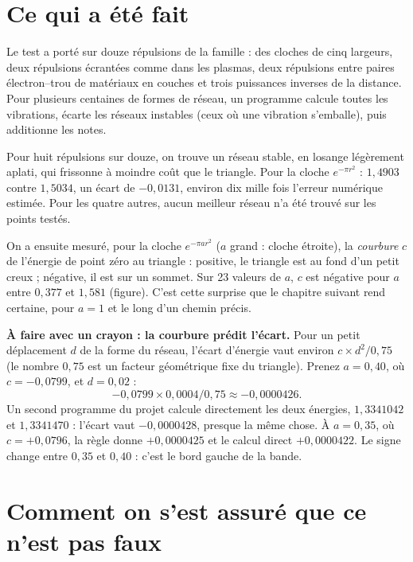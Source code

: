 \section*{Ce qui a été fait}

Le test a porté sur douze répulsions de la famille : des cloches de cinq largeurs, deux
répulsions écrantées comme dans les plasmas, deux répulsions entre paires électron--trou de
matériaux en couches et trois puissances inverses de la distance. Pour plusieurs centaines de
formes de réseau, un programme calcule toutes les vibrations, écarte les réseaux instables (ceux où une
vibration s'emballe), puis additionne les notes.

Pour huit répulsions sur douze, on trouve un réseau stable, en losange légèrement aplati, qui
frissonne à moindre coût que le triangle. Pour la cloche $e^{-\pi r^2}$ : $1{,}4903$ contre
$1{,}5034$, un écart de $-0{,}0131$, environ dix mille fois l'erreur numérique estimée. Pour
les quatre autres, aucun meilleur réseau n'a été trouvé sur les points testés.

On a ensuite mesuré, pour la cloche $e^{-\pi a r^2}$ ($a$ grand : cloche étroite), la
\emph{courbure} $c$ de l'énergie de point zéro au triangle : positive, le triangle est au fond
d'un petit creux ; négative, il est sur un sommet. Sur 23 valeurs de $a$, $c$ est négative
pour $a$ entre $0{,}377$ et $1{,}581$ (figure). C'est cette surprise que le chapitre suivant
rend certaine, pour $a=1$ et le long d'un chemin précis.

\begin{encadre}
\textbf{À faire avec un crayon : la courbure prédit l'écart.} Pour un petit déplacement $d$
de la forme du réseau, l'écart d'énergie vaut environ $c\times d^2/0{,}75$ (le nombre
$0{,}75$ est un facteur géométrique fixe du triangle). Prenez $a=0{,}40$, où $c=-0{,}0799$,
et $d=0{,}02$ :
\[-0{,}0799\times0{,}0004/0{,}75\approx-0{,}0000426.\]
Un second programme du projet calcule directement les deux énergies, $1{,}3341042$ et
$1{,}3341470$ : l'écart vaut $-0{,}0000428$, presque la même chose. À $a=0{,}35$, où
$c=+0{,}0796$, la règle donne $+0{,}0000425$ et le calcul direct $+0{,}0000422$. Le signe
change entre $0{,}35$ et $0{,}40$ : c'est le bord gauche de la bande.
\end{encadre}

\section*{Comment on s'est assuré que ce n'est pas faux}

